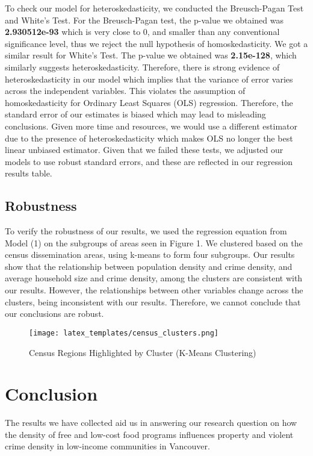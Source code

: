 \documentclass[AEJ]{AEA}
\begin{document}
To check our model for heteroskedasticity, we conducted the Breusch-Pagan Test and White’s Test. For the Breusch-Pagan test, the p-value we obtained was \textbf{2.930512e-93} which is very close to 0, and smaller than any conventional significance level, thus we reject the null hypothesis of homoskedasticity. We got a similar result for White’s Test. The p-value we obtained was \textbf{2.15e-128}, which similarly suggests heteroskedasticity. Therefore, there is strong evidence of heteroskedasticity in our model which implies that the variance of error varies across the independent variables. This violates the assumption of homoskedasticity for Ordinary Least Squares (OLS) regression. Therefore, the standard error of our estimates is biased which may lead to misleading conclusions. Given more time and resources, we would use a different estimator due to the presence of heteroskedasticity which makes OLS no longer the best linear unbiased estimator. Given that we failed these tests, we adjusted our models to use robust standard errors, and these are reflected in our regression results table.

\subsection{Robustness}

To verify the robustness of our results, we used the regression equation from Model (1) on the subgroups of areas seen in Figure 1. We clustered based on the census dissemination areas, using k-means to form four subgroups. Our results show that the relationship between population density and crime density, and average household size and crime density, among the clusters are consistent with our results. However,  the relationships between other variables change across the clusters, being inconsistent with our results. Therefore, we cannot conclude that our conclusions are robust.

\begin{figure}[h!]
\centering
\texttt{[image: latex\_templates/census\_clusters.png]} %
\caption{Census Regions Highlighted by Cluster (K-Means Clustering)}
\end{figure}
\FloatBarrier

\section{Conclusion}

The results we have collected aid us in answering our research question on how the density of free and low-cost food programs influences property and violent crime density in low-income communities in Vancouver.
\end{document}
